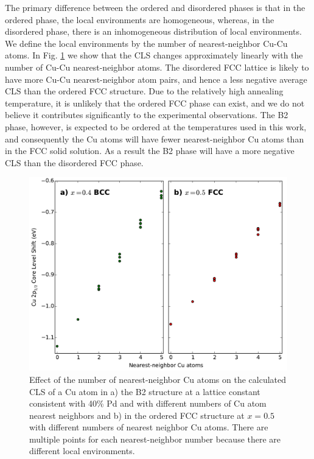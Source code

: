 \documentclass[number, sort&compress, review, 12pt]{elsarticle}
\begin{document}
The primary difference between the ordered and disordered phases is that in the ordered phase, the local environments are homogeneous, whereas, in the disordered phase, there is an inhomogeneous distribution of local environments. We define the local environments by the number of nearest-neighbor Cu-Cu atoms. In Fig. \ref{fig-cls-nimp} we show that the CLS changes approximately linearly with the number of Cu-Cu nearest-neighbor atoms. The disordered FCC lattice is likely to have more Cu-Cu nearest-neighbor atom pairs, and hence a less negative average CLS than the ordered FCC structure. Due to the relatively high annealing temperature, it is unlikely that the ordered FCC phase can exist, and we do not believe it contributes significantly to the experimental observations. The B2 phase, however, is expected to be ordered at the temperatures used in this work, and consequently the Cu atoms will have fewer nearest-neighbor Cu atoms than in the FCC solid solution. As a result the B2 phase will have a  more negative CLS than the disordered FCC phase.

\begin{figure}[H]
\centering
\includegraphics[width=6in]{impurity}
\caption{\label{fig-cls-nimp}Effect of the number of nearest-neighbor Cu atoms on the calculated CLS of a Cu atom in a) the B2 structure at a lattice constant consistent with 40\% Pd and with different numbers of Cu atom nearest neighbors and b) in the ordered FCC structure at $x=0.5$ with different numbers of nearest neighbor Cu atoms. There are multiple points for each nearest-neighbor number because there are different local environments.}
\end{figure}
\end{document}
